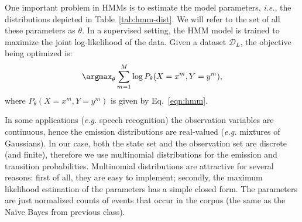 

One important problem in HMMs is to estimate the 
model parameters, \emph{ i.e.}, 
the distributions depicted in Table~\ref{tab:hmm-dist}. 
We will refer to the set of all these parameters 
as $\theta$. 
In a supervised setting, the HMM model
is trained to maximize the joint log-likelihood of the data. Given a
dataset $\mathcal{D}_L$, the objective being optimized is:
\begin{equation}
\argmax_{\theta} \sum_{m=1}^M \log P_{\theta}(X=x^m,Y=y^m),
\end{equation}
where $P_{\theta}(X=x^m,Y=y^m)$ is given by Eq.~\ref{eqn:hmm}.

In some applications (\emph{e.g.} speech recognition) 
the observation variables are continuous, hence the emission distributions are real-valued (\emph{e.g.} mixtures of Gaussians).
In our case, both the state set and the observation set are discrete (and finite), therefore we use
multinomial distributions for the emission and 
transition probabilities. 
Multinomial distributions are attractive for several reasons: first of
all, they are easy to implement; secondly, the maximum likelihood estimation of the parameters has a simple closed form. The parameters are just
normalized counts of events that occur in the corpus (the same as the
Na\"{i}ve Bayes from previous class).

